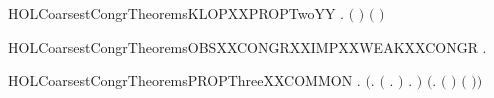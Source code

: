 \newcommand{\HOLCoarsestCongrTheoremsKLOPXXPROPTwo}{\UseVerbatim{HOLCoarsestCongrTheoremsKLOPXXPROPTwo}}
\begin{SaveVerbatim}{HOLCoarsestCongrTheoremsKLOPXXPROPTwoYY}
\HOLTokenTurnstile{} \HOLSymConst{\HOLTokenForall{}}  .  \HOLSymConst{\HOLTokenLt{}}  \HOLSymConst{\HOLTokenImp{}} \HOLSymConst{\HOLTokenNeg{}} \ensuremath{(}  \ensuremath{)} \ensuremath{(}  \ensuremath{)}
\end{SaveVerbatim}
\newcommand{\HOLCoarsestCongrTheoremsKLOPXXPROPTwoYY}{\UseVerbatim{HOLCoarsestCongrTheoremsKLOPXXPROPTwoYY}}
\begin{SaveVerbatim}{HOLCoarsestCongrTheoremsOBSXXCONGRXXIMPXXWEAKXXCONGR}
\HOLTokenTurnstile{} \HOLSymConst{\HOLTokenForall{}} .    \HOLSymConst{\HOLTokenImp{}}   
\end{SaveVerbatim}
\newcommand{\HOLCoarsestCongrTheoremsOBSXXCONGRXXIMPXXWEAKXXCONGR}{\UseVerbatim{HOLCoarsestCongrTheoremsOBSXXCONGRXXIMPXXWEAKXXCONGR}}
\begin{SaveVerbatim}{HOLCoarsestCongrTheoremsPROPThreeXXCOMMON}
\HOLTokenTurnstile{} \HOLSymConst{\HOLTokenForall{}} .
       \ensuremath{(}\HOLSymConst{\HOLTokenExists{}}.
              \HOLSymConst{\HOLTokenConj{}} \ensuremath{(}\HOLSymConst{\HOLTokenForall{}} .  \HOLTokenWeakTransBegin{}\HOLTokenWeakTransEnd {} \HOLSymConst{\HOLTokenImp{}} \HOLSymConst{\HOLTokenNeg{}}  \ensuremath{)} \HOLSymConst{\HOLTokenConj{}}
            \HOLSymConst{\HOLTokenForall{}} .  \HOLTokenWeakTransBegin{}\HOLTokenWeakTransEnd {} \HOLSymConst{\HOLTokenImp{}} \HOLSymConst{\HOLTokenNeg{}}  \ensuremath{)} \HOLSymConst{\HOLTokenImp{}}
       \ensuremath{(}\HOLSymConst{\HOLTokenForall{}}.  \ensuremath{(} \HOLSymConst{\ensuremath{+}} \ensuremath{)} \ensuremath{(} \HOLSymConst{\ensuremath{+}} \ensuremath{)}\ensuremath{)} \HOLSymConst{\HOLTokenImp{}}
         
\end{SaveVerbatim}
